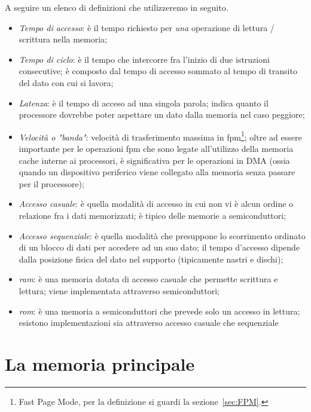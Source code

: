 \documentclass[class=book, crop=false, oneside]{standalone}
\begin{document}
A seguire un elenco di definizioni che utilizzeremo in seguito.
\begin{itemize}
	\item \emph{Tempo di accesso}: è il tempo richiesto per \emph{una} operazione di lettura / scrittura nella memoria;
	\item \emph{Tempo di ciclo}: è il tempo che intercorre fra l'inizio di due istruzioni consecutive; è composto dal tempo di accesso sommato al tempo di transito del dato con cui si lavora;
	\item \emph{Latenza}: è il tempo di acceso ad una singola parola; indica quanto il processore dovrebbe poter aspettare un dato dalla memoria nel caso peggiore;
	\item \emph{Velocità o "banda"}: velocità di trasferimento massima in \acrshort{fpm}\footnote{Fast Page Mode, per la definizione si guardi la sezione~\ref{sec:FPM}.}; oltre ad essere importante per le operazioni \acrshort{fpm} che sono legate all'utilizzo della memoria cache interne ai processori, è significativa per le operazioni in DMA (ossia quando un dispositivo periferico viene collegato alla memoria senza passare per il processore);
	\item \emph{Accesso casuale}: è quella modalità di accesso in cui non vi è alcun ordine o relazione fra i dati memorizzati; è tipico delle memorie a semiconduttori;
	\item \emph{Accesso sequenziale}: è quella modalità che presuppone lo scorrimento ordinato di un blocco di dati per accedere ad un suo dato; il tempo d'accesso dipende dalla posizione fisica del dato nel supporto (tipicamente nastri e dischi);
	\item \emph{\acrfull{ram}}: è una memoria dotata di accesso casuale che permette scrittura e lettura; viene implementata attraverso semiconduttori;
	\item \emph{\acrfull{rom}}: è una memoria a semiconduttori che prevede solo un accesso in lettura; esistono implementazioni sia attraverso accesso casuale che sequenziale
\end{itemize}

\section{La memoria principale}
\end{document}
